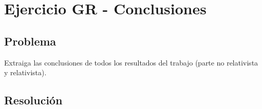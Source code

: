 \section{Ejercicio GR - Conclusiones}

\subsection{Problema}

Extraiga las conclusiones de todos los resultados del trabajo (parte no relativista y relativista).


\subsection{Resolución} 

